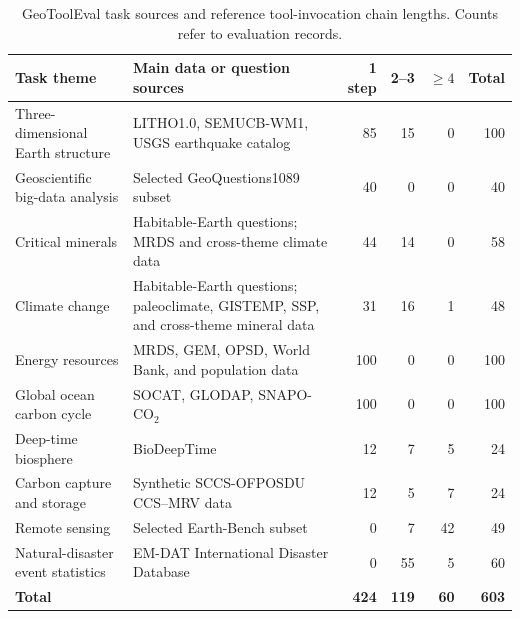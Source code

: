 \begin{table}[t]
  \caption{GeoToolEval task sources and reference tool-invocation chain lengths. Counts refer to evaluation records.}
  \label{tab:benchmark}
  \centering
  \begin{tabularx}{\textwidth}{@{}p{}Xrrrr@{}}
    \toprule
    Task theme & Main data or question sources & 1 step & 2--3 & $\geq4$ & Total \\
    \midrule
    Three-dimensional Earth structure & LITHO1.0, SEMUCB-WM1, USGS earthquake catalog & 85 & 15 & 0 & 100 \\
    Geoscientific big-data analysis & Selected GeoQuestions1089 subset & 40 & 0 & 0 & 40 \\
    Critical minerals & Habitable-Earth questions; MRDS and cross-theme climate data & 44 & 14 & 0 & 58 \\
    Climate change & Habitable-Earth questions; paleoclimate, GISTEMP, SSP, and cross-theme mineral data & 31 & 16 & 1 & 48 \\
    Energy resources & MRDS, GEM, OPSD, World Bank, and population data & 100 & 0 & 0 & 100 \\
    Global ocean carbon cycle & SOCAT, GLODAP, SNAPO-CO$_2$ & 100 & 0 & 0 & 100 \\
    Deep-time biosphere & BioDeepTime & 12 & 7 & 5 & 24 \\
    Carbon capture and storage & Synthetic SCCS-OFPOSDU CCS--MRV data & 12 & 5 & 7 & 24 \\
    Remote sensing & Selected Earth-Bench subset & 0 & 7 & 42 & 49 \\
    Natural-disaster event statistics & EM-DAT International Disaster Database & 0 & 55 & 5 & 60 \\
    \midrule
    \textbf{Total} & & \textbf{424} & \textbf{119} & \textbf{60} & \textbf{603} \\
    \bottomrule
  \end{tabularx}
\end{table}

